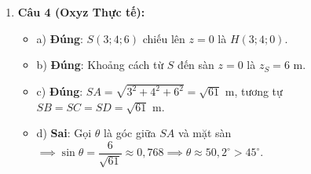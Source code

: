 \documentclass[12pt,a4paper]{article}
\begin{document}
\begin{enumerate}[label=\textbf{Câu \arabic*:}, leftmargin=*]
\item \textbf{Câu 4 (Oxyz Thực tế):}
\begin{itemize}
    \item a) \textbf{Đúng}: $S(3; 4; 6)$ chiếu lên $z=0$ là $H(3; 4; 0)$.
    \item b) \textbf{Đúng}: Khoảng cách từ $S$ đến sàn $z=0$ là $z_S = 6\text{ m}$.
    \item c) \textbf{Đúng}: $SA = \sqrt{3^2 + 4^2 + 6^2} = \sqrt{61}\text{ m}$, tương tự $SB = SC = SD = \sqrt{61}\text{ m}$.
    \item d) \textbf{Sai}: Gọi $\theta$ là góc giữa $SA$ và mặt sàn $\implies \sin\theta = \dfrac{6}{\sqrt{61}} \approx 0{,}768 \implies \theta \approx 50{,}2^\circ > 45^\circ$.
\end{itemize}

\end{enumerate}
\end{document}
